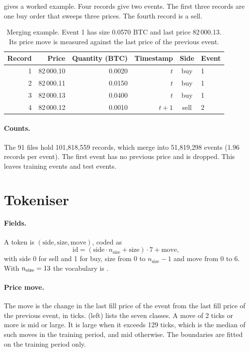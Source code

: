\documentclass[11pt]{article}
\begin{document}
 gives a worked example.
Four records give two events.
The first three records are one buy order that sweeps three prices.
The fourth record is a sell.

\begin{table}[h]
\centering\small
\begin{tabular}{rrrrcl}
\toprule
Record & Price & Quantity (BTC) & Timestamp & Side & Event \\
\midrule
1 & 82\,000.10 & 0.0020 & $t$   & buy  & 1 \\
2 & 82\,000.11 & 0.0150 & $t$   & buy  & 1 \\
3 & 82\,000.13 & 0.0400 & $t$   & buy  & 1 \\
4 & 82\,000.12 & 0.0010 & $t+1$ & sell & 2 \\
\bottomrule
\end{tabular}
\caption{Merging example. Event 1 has size 0.0570 BTC and last price 82\,000.13. Its price move is measured against the last price of the previous event.}
\label{tab:merge}
\end{table}

\paragraph{Counts.}
The 91 files hold 101{,}818{,}559 records, which merge into 51{,}819{,}298 events (1.96 records per event).
The first event has no previous price and is dropped.
This leaves \NTrain{} training events and \NTest{} test events.

\section{Tokeniser}\label{app:tokens}

\paragraph{Fields.}
A token is $(\text{side},\text{size},\text{move})$, coded as
\begin{equation}
  \text{id}=(\text{side}\cdot n_{\text{size}}+\text{size})\cdot 7+\text{move},
\end{equation}
with side 0 for sell and 1 for buy, size from 0 to $n_{\text{size}}-1$ and move from 0 to 6.
With $n_{\text{size}}=13{}$ the vocabulary is \Vocab{}.

\paragraph{Price move.}
The move is the change in the last fill price of the event from the last fill price of the previous event, in ticks.
 (left) lists the seven classes.
A move of 2 ticks or more is mid or large.
It is large when it exceeds 129 ticks, which is the median of such moves in the training period, and mid otherwise.
The boundaries are fitted on the training period only.
\end{document}
